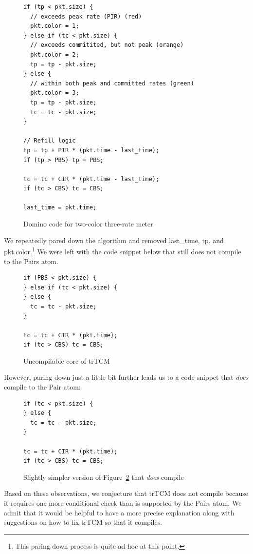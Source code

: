 \begin{figure}[h]
\begin{verbatim}
if (tp < pkt.size) {
  // exceeds peak rate (PIR) (red)
  pkt.color = 1;
} else if (tc < pkt.size) {
  // exceeds commitited, but not peak (orange)
  pkt.color = 2;
  tp = tp - pkt.size;
} else {
  // within both peak and committed rates (green)
  pkt.color = 3;
  tp = tp - pkt.size;
  tc = tc - pkt.size;
}

// Refill logic
tp = tp + PIR * (pkt.time - last_time);
if (tp > PBS) tp = PBS;

tc = tc + CIR * (pkt.time - last_time);
if (tc > CBS) tc = CBS;

last_time = pkt.time;
\end{verbatim}
\caption{Domino code for two-color three-rate meter}
\label{fig:trTCM}
\end{figure}

We repeatedly pared down the algorithm and removed last\_time, tp, and
pkt.color.\footnote{This paring down process is quite ad hoc at this point.} We
were left with the code snippet below that still does not compile to the Pairs
atom.

\begin{figure}[h]
\begin{verbatim}
if (PBS < pkt.size) {
} else if (tc < pkt.size) {
} else {
  tc = tc - pkt.size;
}

tc = tc + CIR * (pkt.time);
if (tc > CBS) tc = CBS;
\end{verbatim}
\caption{Uncompilable core of trTCM}
\label{fig:trTCM_core}
\end{figure}

However, paring down just a little bit further leads us to a code snippet that
{\em does} compile to the Pair atom:

\begin{figure}[h]
\begin{verbatim}
if (tc < pkt.size) {
} else {
  tc = tc - pkt.size;
}

tc = tc + CIR * (pkt.time);
if (tc > CBS) tc = CBS;
\end{verbatim}
\caption{Slightly simpler version of Figure~\ref{fig:trTCM_core} that {\em does} compile}
\label{fig:trTCM_compiles}
\end{figure}

Based on these observations, we conjecture that trTCM does not
compile because it requires one more conditional check than is supported by the
Pairs atom. We admit that it would be helpful to have a more precise
explanation along with suggestions on how to fix trTCM so that it compiles.

